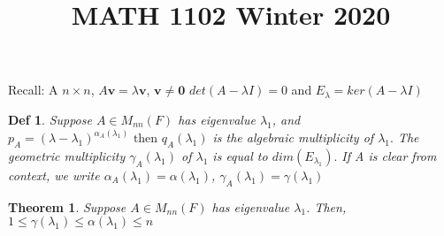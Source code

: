 \documentclass[a4paper,12pt]{article}
\title{MATH 1102 Winter 2020}
\newtheorem{theorem}{Theorem}
\newtheorem{definition}{Def}
\renewcommand{\vec}[1]{\mathbf{#1}}
\begin{document}
\maketitle
Recall: A $n \times n$, $A\vec{v} = \lambda \vec{v}$, $\vec{v} \neq \vec{0}$
$det(A-\lambda I) = 0$ and $E_{\lambda} = ker(A-\lambda I)$ 

\begin{definition}
  Suppose $A\in M_{nn}(F)$ has eigenvalue $\lambda_{1}$, 
  and $p_{A} = (\lambda - \lambda_{1})^{\alpha_A(\lambda_{1})} \text{ then }q_{A}(\lambda_{1})$
  is the algebraic multiplicity of $\lambda_{1}.$ The geometric multiplicity
  $\gamma_{A}(\lambda_{1})$ of $\lambda_{1}$ is equal to $dim(E_{\lambda_{1}}).$
  If A is clear from context, we write $\alpha_{A}(\lambda_{1}) = \alpha(\lambda_{1})$,
  $\gamma_{A}(\lambda_{1}) = \gamma(\lambda_{1})$  
\end{definition}

\begin{theorem}
Suppose $A \in M_{nn}(F)$ has eigenvalue $\lambda_{1}$. Then, 
$1 \leq \gamma(\lambda_{1}) \leq \alpha(\lambda_{1}) \leq n$
\end{theorem}
\end{document}
